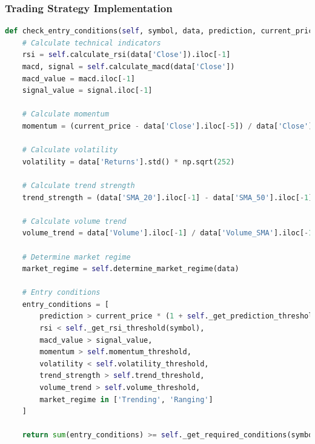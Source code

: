 \documentclass[conference]{IEEEtran}
\begin{document}
\subsubsection{Trading Strategy Implementation}
\begin{lstlisting}[language=Python]
def check_entry_conditions(self, symbol, data, prediction, current_price):
    # Calculate technical indicators
    rsi = self.calculate_rsi(data['Close']).iloc[-1]
    macd, signal = self.calculate_macd(data['Close'])
    macd_value = macd.iloc[-1]
    signal_value = signal.iloc[-1]
    
    # Calculate momentum
    momentum = (current_price - data['Close'].iloc[-5]) / data['Close'].iloc[-5]
    
    # Calculate volatility
    volatility = data['Returns'].std() * np.sqrt(252)
    
    # Calculate trend strength
    trend_strength = (data['SMA_20'].iloc[-1] - data['SMA_50'].iloc[-1]) / data['SMA_50'].iloc[-1]
    
    # Calculate volume trend
    volume_trend = data['Volume'].iloc[-1] / data['Volume_SMA'].iloc[-1]
    
    # Determine market regime
    market_regime = self.determine_market_regime(data)
    
    # Entry conditions
    entry_conditions = [
        prediction > current_price * (1 + self._get_prediction_threshold(symbol)),
        rsi < self._get_rsi_threshold(symbol),
        macd_value > signal_value,
        momentum > self.momentum_threshold,
        volatility < self.volatility_threshold,
        trend_strength > self.trend_threshold,
        volume_trend > self.volume_threshold,
        market_regime in ['Trending', 'Ranging']
    ]
    
    return sum(entry_conditions) >= self._get_required_conditions(symbol)
\end{lstlisting}
\end{document}
